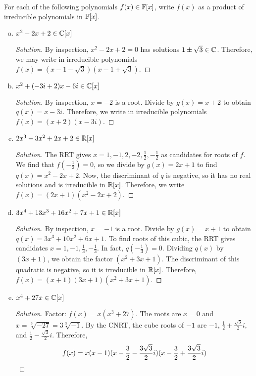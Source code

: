 \question For each of the following polynomials $f(x) \in \mathbb{F}[x]$,
write $f(x)$ as a product of irreducible polynomials in $\mathbb{F}[x]$.
\begin{enumerate}[(a)]
  \item $x^2 - 2x + 2 \in \mathbb{C}[x]$
        \begin{proof}[Solution]
          By inspection, $x^2-2x+2 = 0$ has solutions $1 \pm \sqrt3 \in \mathbb{C}$.
          Therefore, we may write in irreducible polynomials $f(x)=(x-1-\sqrt3)(x-1+\sqrt3)$.
        \end{proof}
  \item $x^2 + (-3i + 2)x - 6i \in \mathbb{C}[x]$
        \begin{proof}[Solution]
          By inspection, $x=-2$ is a root.
          Divide by $g(x)=x+2$ to obtain $q(x)=x-3i$.
          Therefore, we write in irreducible polynomials $f(x)=(x+2)(x-3i)$.
        \end{proof}
  \item $2x^3 - 3x^2 + 2x + 2 \in \mathbb{R}[x]$
        \begin{proof}[Solution]
          The RRT gives $x=1,-1,2,-2,\frac12,-\frac12$ as candidates for roots of $f$.
          We find that $f(-\frac12)=0$, so we divide by $g(x)=2x+1$ to find $q(x)=x^2-2x+2$.
          Now, the discriminant of $q$ is negative, so it has no real solutions and is irreducible in $\mathbb{R}[x]$.
          Therefore, we write $f(x)=(2x+1)(x^2-2x+2)$.
        \end{proof}
  \item $3x^4 + 13x^3 + 16x^2 + 7x + 1 \in \mathbb{R}[x]$
        \begin{proof}[Solution]
          By inspection, $x=-1$ is a root.
          Divide by $g(x)=x+1$ to obtain $q(x)=3x^3+10x^2+6x+1$.
          To find roots of this cubic, the RRT gives candidates $x=1,-1,\frac13,-\frac13$.
          In fact, $q(-\frac13)=0$.
          Dividing $q(x)$ by $(3x+1)$, we obtain the factor $(x^2+3x+1)$.
          The discriminant of this quadratic is negative, so it is irreducible in $\mathbb{R}[x]$.
          Therefore, $f(x) = (x+1)(3x+1)(x^2+3x+1)$.
        \end{proof}
  \item $x^4 + 27x \in \mathbb{C}[x]$
        \begin{proof}[Solution]
          Factor: $f(x) = x(x^3 + 27)$.
          The roots are $x=0$ and $x=\sqrt[3]{-27}=3\sqrt[3]{-1}$.
          By the CNRT, the cube roots of $-1$ are $-1$,
          $\frac12+\frac{\sqrt{3}}2i$, and $\frac12-\frac{\sqrt{3}}2i$. Therefore,
          \[ f(x) = x(x-1)(x-\frac{3}{2}-\frac{3\sqrt{3}}{2}i)(x-\frac{3}{2}+\frac{3\sqrt{3}}{2}i) \qedhere \]
        \end{proof}
\end{enumerate}


